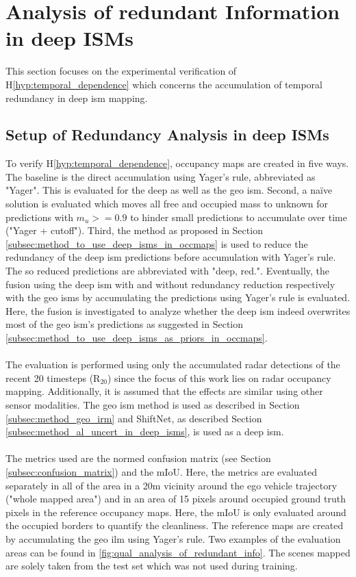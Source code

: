 \section{Analysis of redundant Information in deep ISMs}
\label{sec:exp_analyze_redundant_info}
This section focuses on the experimental verification of H\ref{hyp:temporal_dependence} which concerns the accumulation of temporal redundancy in deep \gls{ism} mapping.
%
\subsection{Setup of Redundancy Analysis in deep ISMs}
\label{subsec:setup_of_red_analy}
To verify H\ref{hyp:temporal_dependence}, occupancy maps are created in five ways. The baseline is the direct accumulation using Yager's rule, abbreviated as "Yager". This is evaluated for the deep as well as the geo \gls{ism}. Second, a na\"ive solution is evaluated which moves all free and occupied mass to unknown for predictions with $m_u>=0.9$ to hinder small predictions to accumulate over time ("Yager + cutoff"). Third, the method as proposed in Section \ref{subsec:method_to_use_deep_isms_in_occmaps} is used to reduce the redundancy of the deep \gls{ism} predictions before accumulation with Yager's rule. The so reduced predictions are abbreviated with "deep, red.". Eventually, the fusion using the deep \gls{ism} with and without redundancy reduction respectively with the geo \gls{ism}s by accumulating the predictions using Yager's rule is evaluated. Here, the fusion is investigated to analyze whether the deep \gls{ism} indeed overwrites most of the geo \gls{ism}'s predictions as suggested in Section \ref{subsec:method_to_use_deep_isms_as_priors_in_occmaps}.
\\\\
The evaluation is performed using only the accumulated radar detections of the recent 20 timesteps (R$_{20}$) since the focus of this work lies on radar occupancy mapping. Additionally, it is assumed that the effects are similar using other sensor modalities. The geo \gls{ism} method is used as described in Section \ref{subsec:method_geo_irm} and ShiftNet, as described Section \ref{subsec:method_al_uncert_in_deep_isms}, is used as a deep \gls{ism}.
\\\\
The metrics used are the normed confusion matrix (see Section \ref{subsec:confusion_matrix}) and the mIoU. Here, the metrics are evaluated separately in all of the area in a 20m vicinity around the ego vehicle trajectory ("whole mapped area") and in an area of 15 pixels around occupied ground truth pixels in the reference occupancy maps. Here, the mIoU is only evaluated around the occupied borders to quantify the cleanliness. The reference maps are created by accumulating the geo \gls{ilm} using Yager's rule. Two examples of the evaluation areas can be found in \ref{fig:qual_analysis_of_redundant_info}. The scenes mapped are solely taken from the test set which was not used during training.
%
